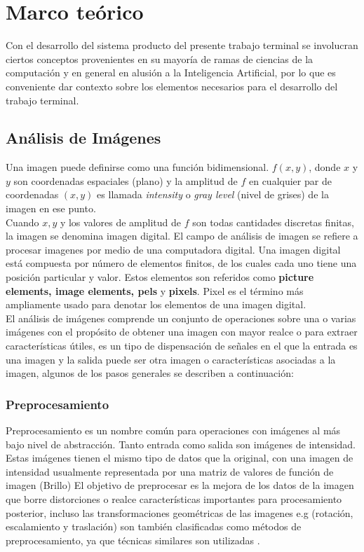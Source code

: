 \chapter{Marco teórico}
Con el desarrollo del sistema producto del presente trabajo terminal se involucran ciertos conceptos provenientes en su mayoría de ramas de ciencias de la computación y en general en alusión a la Inteligencia Artificial, por lo que es conveniente dar contexto sobre los elementos necesarios para el desarrollo del trabajo terminal.
\section{Análisis de Imágenes}\label{imAnalysis}
		
		Una imagen puede definirse como una función bidimensional. $f(x,y)$, donde $x$ y $y$ son coordenadas espaciales (plano) y la amplitud de $f$ en cualquier par de coordenadas $(x,y)$ es llamada \textit{intensity} o \textit{gray level} (nivel de grises) de la imagen en ese punto.
		\\
		Cuando $x, y$ y los valores de amplitud de $f$ son todas cantidades discretas finitas, la imagen se denomina imagen digital. El campo de análisis de imagen se refiere a procesar imagenes por medio de una computadora digital. Una imagen digital está compuesta por número de elementos finitos, de los cuales cada uno tiene una posición particular y valor. Estos elementos son referidos como \textbf{picture elements, image elements, pels} y \textbf{pixels}. Pixel es el término más ampliamente usado para denotar los elementos de una imagen digital.
		\\
		
        El análisis de imágenes comprende un conjunto de operaciones sobre una o varias imágenes con el propósito de obtener una imagen con mayor realce o para extraer características útiles, es un tipo de dispensación de señales en el que la entrada es una imagen y la salida puede ser otra imagen o características asociadas a la imagen, algunos de los pasos generales se describen a continuación:
        
        \subsection{Preprocesamiento}
            Preprocesamiento es un nombre común para operaciones con imágenes al más bajo nivel de abstracción. Tanto entrada como salida son imágenes de intensidad. Estas imágenes tienen el mismo tipo de datos que la original, con una imagen de intensidad usualmente representada por una matriz de valores de función de imagen (Brillo) El objetivo de preprocesar es la mejora de los datos de la imagen que borre distorciones o realce características importantes para procesamiento posterior, incluso las transformaciones geométricas de las imagenes e.g (rotación, escalamiento y traslación) son también clasificadas como métodos de preprocesamiento, ya que técnicas similares son utilizadas \cite{imgAnalySeg}.
               
